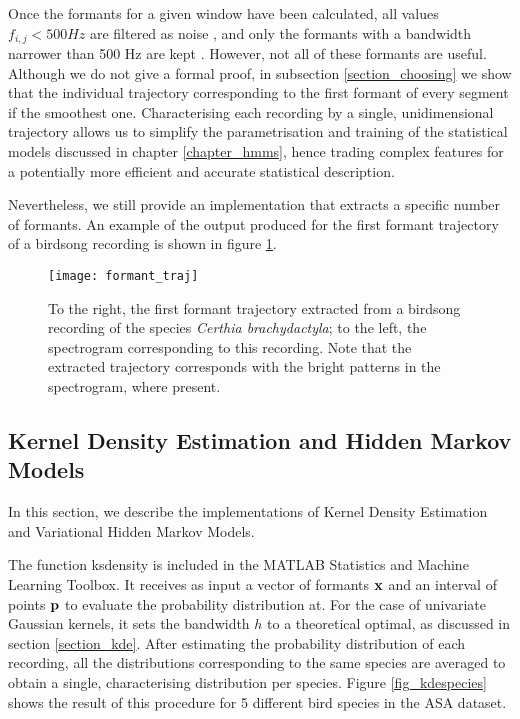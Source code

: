 \documentclass[../main.tex]{subfiles}
\begin{document}
\par Once the formants for a given window have been calculated, all values $f_{i, j} < 500 Hz$ are filtered as noise \cite{Stowell2014}, and only the formants with a bandwidth narrower than 500 Hz are kept \cite{Mathworks2015}. However, not all of these formants are useful. Although we do not give a formal proof, in subsection \ref{section_choosing} we show that the individual trajectory corresponding to the first formant of every segment if the smoothest one. Characterising each recording by a single, unidimensional trajectory allows us to simplify the parametrisation and training of the statistical models discussed in chapter \ref{chapter_hmms}, hence trading complex features for a potentially more efficient and accurate statistical description.
\par Nevertheless, we still provide an implementation that extracts a specific number of formants. An example of the output produced for the first formant trajectory of a birdsong recording is shown in figure \ref{fig_traj}.

\begin{figure}[t]
\centering
\texttt{[image: formant\_traj]}
\caption{To the right, the first formant trajectory extracted from a birdsong recording of the species \emph{Certhia brachydactyla}; to the left, the spectrogram corresponding to this recording. Note that the extracted trajectory corresponds with the bright patterns in the spectrogram, where present.}
\label{fig_traj}
\end{figure}

\subsection{Kernel Density Estimation and Hidden Markov Models} \label{section_imphmms}
In this section, we describe the implementations of Kernel Density Estimation and Variational Hidden Markov Models.
\par The function ksdensity is included in the MATLAB Statistics and Machine Learning Toolbox. It receives as input a vector of formants $\mathbf{x}$ and an interval of points $\mathbf{p}$ to evaluate the probability distribution at. For the case of univariate Gaussian kernels, it sets the bandwidth $h$ to a theoretical optimal, as discussed in section \ref{section_kde}. After estimating the probability distribution of each recording, all the distributions corresponding to the same species are averaged to obtain a single, characterising distribution per species. Figure \ref{fig_kdespecies} shows the result of this procedure for 5 different bird species in the ASA dataset.
\end{document}

